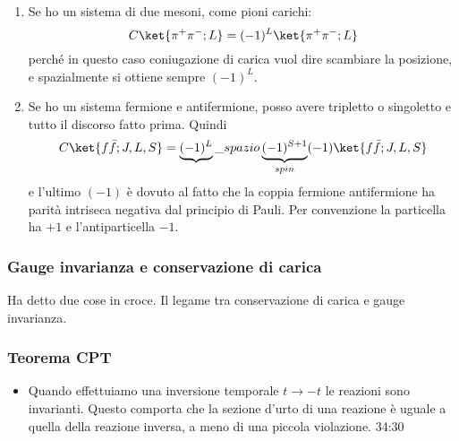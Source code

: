 \begin{itemize}
    \begin{enumerate}
        \item Se ho un sistema di due mesoni, come pioni carichi:
        \begin{equation*}
            C\ket{\pi^+\pi^-;L}=(-1)^{L}\ket{\pi^+\pi^-;L}
        \end{equation*}
        perché in questo caso coniugazione di carica vuol dire scambiare la posizione, e spazialmente si ottiene sempre $(-1)^L$.
        \item Se ho un sistema fermione e antifermione, posso avere tripletto o singoletto e tutto il discorso fatto prima. Quindi
        \begin{equation*}
            C\ket{f\bar f;J,L,S}=\underbrace{(-1)^{L}}\_{spazio}\underbrace{(-1)^{S+1}}_{spin}(-1)\ket{f\bar f;J,L,S}
        \end{equation*}
        e l'ultimo $(-1)$ è dovuto al fatto che la coppia fermione antifermione ha parità intriseca negativa dal principio di Pauli. Per convenzione la particella ha $+1$ e l'antiparticella $-1$.
    \end{enumerate} 
\end{itemize}
\subsubsection{Gauge invarianza e conservazione di carica}
Ha detto due cose in croce. Il legame tra conservazione di carica e gauge invarianza.
\subsubsection{Teorema CPT}
\begin{itemize}
    \item Quando effettuiamo una inversione temporale $t\to-t$ le reazioni sono invarianti. Questo comporta che la sezione d'urto di una reazione è uguale a quella della reazione inversa, a meno di una piccola violazione. 34:30
\end{itemize}